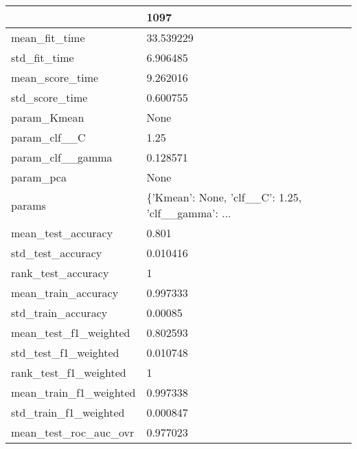 \begin{tabular}{ll}
\toprule
{} &                                               1097 \\
\midrule
mean\_fit\_time               &                                          33.539229 \\
std\_fit\_time                &                                           6.906485 \\
mean\_score\_time             &                                           9.262016 \\
std\_score\_time              &                                           0.600755 \\
param\_Kmean                 &                                               None \\
param\_clf\_\_C                &                                               1.25 \\
param\_clf\_\_gamma            &                                           0.128571 \\
param\_pca                   &                                               None \\
params                      &  \{'Kmean': None, 'clf\_\_C': 1.25, 'clf\_\_gamma': ... \\
mean\_test\_accuracy          &                                              0.801 \\
std\_test\_accuracy           &                                           0.010416 \\
rank\_test\_accuracy          &                                                  1 \\
mean\_train\_accuracy         &                                           0.997333 \\
std\_train\_accuracy          &                                            0.00085 \\
mean\_test\_f1\_weighted       &                                           0.802593 \\
std\_test\_f1\_weighted        &                                           0.010748 \\
rank\_test\_f1\_weighted       &                                                  1 \\
mean\_train\_f1\_weighted      &                                           0.997338 \\
std\_train\_f1\_weighted       &                                           0.000847 \\
mean\_test\_roc\_auc\_ovr       &                                           0.977023 \\

\end{tabular}
